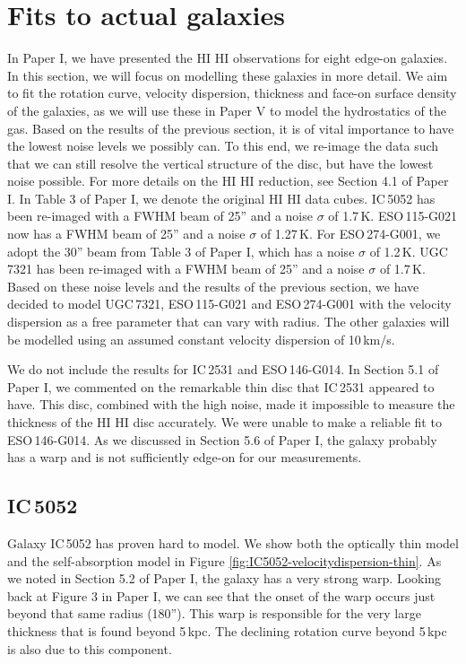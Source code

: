 \documentclass[useAMS,usenatbib]{mn2e}
\newcommand{\hi}{%
  \relax
  \ifmmode
    \textrm{\textsc{HI}}
  \else
    \textsc{H{\smaller}I}
  \fi
}
\begin{document}
\section{Fits to actual galaxies}\label{sec:HIfittingresults}
In Paper I, we have presented the \hi observations 
for eight edge-on galaxies. 
In this section, we will focus on modelling these galaxies in more detail.
We aim to fit the rotation curve, velocity dispersion, thickness 
and face-on surface density of the galaxies, as we will use these 
in Paper V to model the hydrostatics of the gas.
Based on the results of the previous section, it is of vital 
importance to have the lowest noise levels we possibly can.
To this end, we re-image the data such that we can still resolve 
the vertical structure of the disc, but have the lowest noise possible.
For more details on the \hi reduction, see Section 4.1 of Paper I.
In Table 3 of Paper I, we denote the original  \hi data cubes.
IC\,5052 has been re-imaged with a FWHM beam of 25'' and a noise 
$\sigma$ of 1.7\,K.
ESO\,115-G021 now has a FWHM beam of 25'' and a noise $\sigma$ of 1.27\,K.
For ESO\,274-G001, we adopt the 30'' beam from Table 
3 of Paper I, which has a noise $\sigma$ of 1.2\,K.
UGC\,7321 has been re-imaged with a FWHM beam of 25'' and a 
noise $\sigma$ of 1.7\,K.
Based on these noise levels and the results of the previous section, 
we have decided to model UGC\,7321, ESO\,115-G021 and ESO\,274-G001 
with the velocity dispersion as a free parameter that can vary with radius.
The other galaxies will be modelled using an assumed constant velocity 
dispersion of 10\,km/s.

We do not include the results for IC\,2531 and ESO\,146-G014. 
In Section 5.1 of Paper I, we commented on the remarkable thin 
disc that IC\,2531 appeared to have.
This disc, combined with the high noise, made it impossible to  
measure the thickness of the \hi disc accurately.
We were unable to make a reliable fit to ESO\,146-G014.
As we discussed in Section 5.6 of Paper I, the galaxy probably 
has a warp and is not sufficiently edge-on for our measurements.

\subsection{IC\,5052}
Galaxy IC\,5052 has proven hard to model.
We show both the optically thin model and the self-absorption model in 
Figure \ref{fig:IC5052-velocitydispersion-thin}.
As we noted in Section 5.2 of Paper I, the galaxy has a very strong warp. 
Looking back at Figure 3 in Paper I, we can see that 
the onset of the warp occurs just beyond that same radius (180'').
This warp is responsible for the very large thickness that is found 
beyond 5\,kpc.
The declining rotation curve beyond 5\,kpc is also due to this component.
\end{document}
